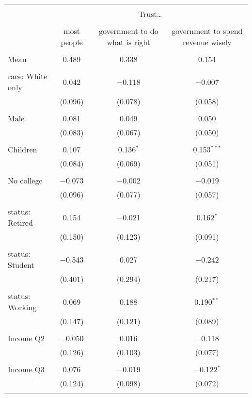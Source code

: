 
\begin{tabular}{@{\extracolsep{5pt}}lccc} 
\\[-1.8ex]\hline 
\hline \\[-1.8ex] 
 & \multicolumn{3}{c}{Trust…} \\ 
\cline{2-4} 
\\[-1.8ex] & most people & government to do what is right & government to spend revenue wisely \\ 
\hline \\[-1.8ex] 
 Mean & 0.489 & 0.338 & 0.154  \\ \hline \\[-1.8ex] race: White only & 0.042 & $-$0.118 & $-$0.007 \\ 
  & (0.096) & (0.078) & (0.058) \\ 
  & & & \\ 
 Male & 0.081 & 0.049 & 0.050 \\ 
  & (0.083) & (0.067) & (0.050) \\ 
  & & & \\ 
 Children & 0.107 & 0.136$^{*}$ & 0.153$^{***}$ \\ 
  & (0.084) & (0.069) & (0.051) \\ 
  & & & \\ 
 No college & $-$0.073 & $-$0.002 & $-$0.019 \\ 
  & (0.096) & (0.077) & (0.057) \\ 
  & & & \\ 
 status: Retired & 0.154 & $-$0.021 & 0.162$^{*}$ \\ 
  & (0.150) & (0.123) & (0.091) \\ 
  & & & \\ 
 status: Student & $-$0.543 & 0.027 & $-$0.242 \\ 
  & (0.401) & (0.294) & (0.217) \\ 
  & & & \\ 
 status: Working & 0.069 & 0.188 & 0.190$^{**}$ \\ 
  & (0.147) & (0.121) & (0.089) \\ 
  & & & \\ 
 Income Q2 & $-$0.050 & 0.016 & $-$0.118 \\ 
  & (0.126) & (0.103) & (0.077) \\ 
  & & & \\ 
 Income Q3 & 0.076 & $-$0.019 & $-$0.122$^{*}$ \\ 
  & (0.124) & (0.098) & (0.072) \\ 
  & & & \\ 

\end{tabular}
